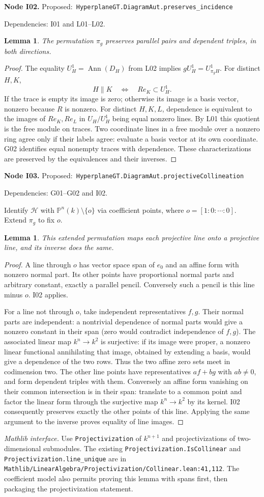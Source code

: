\documentclass[11pt]{article}
\newtheorem{lemma}[theorem]{Lemma}
\theoremstyle{remark}\newtheorem{remark}[theorem]{Remark}
\newcommand{\Pj}{\mathbb P}
\newcommand{\cH}{\mathcal H}
\newcommand{\Ann}{\operatorname{Ann}}
\newcommand{\code}[1]{\nolinkurl{#1}}
\newcommand{\node}[3]{\par\Needspace{8\baselineskip}\smallskip\noindent\textbf{Node #1.}\quad
 \textsf{Proposed:}\ \code{#2}\par\noindent
 \textsf{Dependencies:} #3.\par\smallskip}
\begin{document}
\node{I02}{HyperplaneGT.DiagramAut.preserves_incidence}{I01 and L01--L02}
\begin{lemma}\label{lem:i02}
The permutation $\pi_g$ preserves parallel pairs and dependent
triples, in both directions.
\end{lemma}
\begin{proof}
The equality $U_H^1=\Ann(D_H)$ from L02 implies
$gU_H^1=U_{\pi_gH}^1$. For distinct $H,K$,
\[
 H\parallel K\quad\Longleftrightarrow\quad Re_K\subset U_H^1.
\]
If the trace is empty its image is zero; otherwise its image is a
basis vector, nonzero because $R$ is nonzero. For distinct $H,K,L$,
dependence is equivalent to the images of $Re_K,Re_L$ in
$U_H/U_H^1$ being equal nonzero lines. By L01 this quotient is the
free module on traces. Two coordinate lines in a free module over
a nonzero ring agree only if their labels agree: evaluate a basis
vector at its own coordinate. G02 identifies equal nonempty traces
with dependence. These characterizations are preserved by the
equivalences and their inverses.
\end{proof}

\node{I03}{HyperplaneGT.DiagramAut.projectiveCollineation}{G01--G02 and I02}
Identify $\cH$ with $\Pj^n(k)\setminus\{o\}$ via coefficient
points, where $o=[1:0:\cdots:0]$. Extend $\pi_g$ to fix $o$.
\begin{lemma}\label{lem:i03}
This extended permutation maps each projective line onto a
projective line, and its inverse does the same.
\end{lemma}
\begin{proof}
A line through $o$ has vector space span of $e_0$ and an affine
form with nonzero normal part. Its other points have proportional
normal parts and arbitrary constant, exactly a parallel pencil.
Conversely such a pencil is this line minus $o$. I02 applies.

For a line not through $o$, take independent representatives $f,g$.
Their normal parts are independent: a nontrivial dependence of
normal parts would give a nonzero constant in their span (zero
would contradict independence of $f,g$). The associated linear
map $k^n\to k^2$ is surjective: if its image were proper, a
nonzero linear functional annihilating that image, obtained by
extending a basis, would give a dependence of the two rows.
Thus the two affine zero sets meet in codimension two. The other
line points have representatives $af+bg$ with $ab\ne0$, and form
dependent triples with them. Conversely an affine form vanishing
on their common intersection is in their span: translate to a
common point and factor the linear form through the surjective
map $k^n\to k^2$ by its kernel. I02 consequently preserves exactly
the other points of this line. Applying the same argument to the
inverse proves equality of line images.
\end{proof}
\emph{Mathlib interface.} Use \code{Projectivization} of
$k^{n+1}$ and projectivizations of two-dimensional submodules.
The existing \code{Projectivization.IsCollinear} and
\code{Projectivization.line_unique} are in
\code{Mathlib/LinearAlgebra/Projectivization/Collinear.lean:41,112}.
The coefficient model also permits proving this lemma with spans
first, then packaging the projectivization statement.
\end{document}
